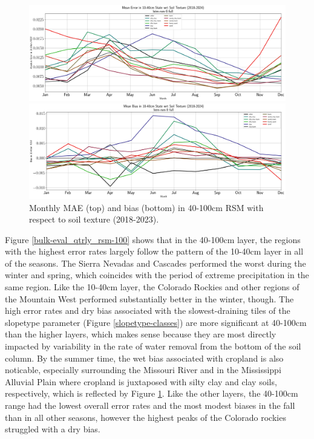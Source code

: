 \begin{figure}[h!]
    \centering

    \includegraphics[width=.99\linewidth,draft=false]{figures/grid-eval_qtrly/eval-grid_full_lstm-rsm-9_pixelwise-time-stats_monthly-txtr-abs-err-state-rsm-40.png}

    \includegraphics[width=.99\linewidth,draft=false]{figures/grid-eval_qtrly/eval-grid_full_lstm-rsm-9_pixelwise-time-stats_monthly-txtr-bias-state-rsm-40.png}

    \caption{Monthly MAE (top) and bias (bottom) in 40-100cm RSM with respect to soil texture (2018-2023).}
    \label{bulk-eval_monthly_txtr-bias_rsm-100}
\end{figure}


Figure \ref{bulk-eval_qtrly_rsm-100} shows that in the 40-100cm layer, the regions with the highest error rates largely follow the pattern of the 10-40cm layer in all of the seasons. The Sierra Nevadas and Cascades performed the worst during the winter and spring, which coincides with the period of extreme precipitation in the same region. Like the 10-40cm layer, the Colorado Rockies and other regions of the Mountain West performed substantially better in the winter, though. The high error rates and dry bias associated with the slowest-draining tiles of the slopetype parameter (Figure \ref{slopetype-classes}) are more significant at 40-100cm than the higher layers, which makes sense because they are most directly impacted by variability in the rate of water removal from the bottom of the soil column. By the summer time, the wet bias associated with cropland is also noticable, especially surrounding the Missouri River and in the Mississippi Alluvial Plain where cropland is juxtaposed with silty clay and clay soils, respectively, which is reflected by Figure \ref{bulk-eval_monthly_txtr-bias_rsm-100}. Like the other layers, the 40-100cm range had the lowest overall error rates and the most modest biases in the fall than in all other seasons, however the highest peaks of the Colorado rockies struggled with a dry bias.

